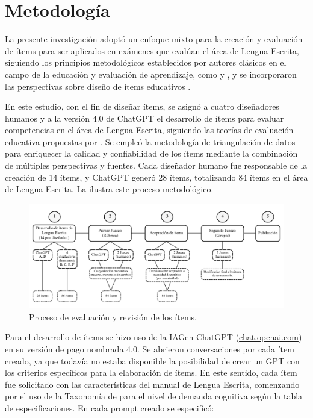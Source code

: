 \section{Metodología}\label{sec-Metodología}
La presente investigación adoptó un enfoque mixto para la creación y
evaluación de ítems para ser aplicados en exámenes que evalúan el área
de Lengua Escrita, siguiendo los principios metodológicos establecidos
por autores clásicos en el campo de la educación y evaluación de
aprendizaje, como \textcite{Bloom1956} y \textcite{Messick1989}, y se incorporaron las
perspectivas sobre diseño de ítems educativos \cite{Haladyna2002}.

En este estudio, con el fin de diseñar ítems, se asignó a cuatro
diseñadores humanos y a la versión 4.0 de ChatGPT \cite{OpenAI2023} el
desarrollo de ítems para evaluar competencias en el área de Lengua
Escrita, siguiendo las teorías de evaluación educativa propuestas por
\textcite{Popham1990}. Se empleó la metodología de triangulación de datos
\cite{Denzin1978} para enriquecer la calidad y confiabilidad de los ítems
mediante la combinación de múltiples perspectivas y fuentes. Cada
diseñador humano fue responsable de la creación de 14 ítems, y ChatGPT
generó 28 ítems, totalizando 84 ítems en el área de Lengua Escrita. La
 ilustra este proceso metodológico.


\begin{figure}[htpb]
\centering
\begin{minipage}{\textwidth}
\includegraphics[width=\textwidth]{image1.png}
\caption{Proceso de evaluación y revisión de los ítems.}
\label{fig01}
\end{minipage}
\end{figure}

Para el desarrollo de ítems se hizo uso de la IAGen ChatGPT
(\url{chat.openai.com}) en su versión de pago nombrada 4.0. Se abrieron
conversaciones por cada ítem creado, ya que todavía no estaba disponible
la posibilidad de crear un GPT con los criterios específicos para la
elaboración de ítems. En este sentido, cada ítem fue solicitado con las
características del manual de Lengua Escrita, comenzando por el uso de
la Taxonomía de \textcite{Anderson2001} para el nivel de demanda
cognitiva según la tabla de especificaciones. En cada prompt creado se
especificó:

